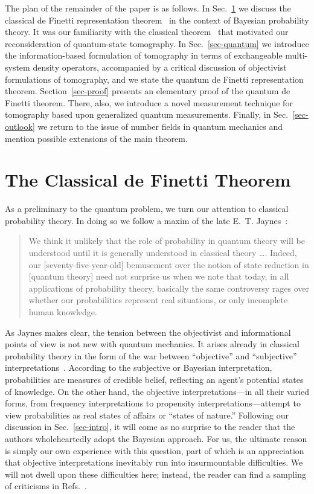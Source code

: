 The plan of the remainder of the paper is as follows. In
Sec.~\ref{sec-classical} we discuss the classical de Finetti
representation theorem~\cite{DeFinetti1990,Heath1976} in the
context of Bayesian probability theory.  It was our familiarity
with the classical theorem~\cite{Galavotti1989,Jeffrey1997} that
motivated our reconsideration of quantum-state tomography. In
Sec.~\ref{sec-quantum} we introduce the information-based
formulation of tomography in terms of exchangeable multi-system
density operators, accompanied by a critical discussion of
objectivist formulations of tomography, and we state the quantum
de Finetti representation theorem.  Section~\ref{sec-proof}
presents an elementary proof of the quantum de Finetti theorem.
There, also, we introduce a novel measurement technique for
tomography based upon generalized quantum measurements.  Finally,
in Sec.~\ref{sec-outlook} we return to the issue of number fields
in quantum mechanics and mention possible extensions of the main
theorem.

\section{The Classical de Finetti Theorem} \label{sec-classical}

As a preliminary to the quantum problem, we turn our attention to
classical probability theory.   In doing so we follow a maxim of
the late E.~T. Jaynes~\cite{Jaynes1986b}:
\begin{quote}
We think it unlikely that the role of probability in quantum theory
will be understood until it is generally understood in classical theory
\ldots.  Indeed, our [seventy-five-year-old] bemusement over the
notion of state reduction in [quantum theory] need not surprise us
when we note that today, in all applications of probability theory,
basically the same controversy rages over whether our probabilities
represent real situations, or only incomplete human knowledge.
\end{quote}

As Jaynes makes clear, the tension between the objectivist and
informational points of view is not new with quantum mechanics.
It arises already in classical probability theory in the form of
the war between ``objective'' and ``subjective''
interpretations~\cite{Daston1994}. According to the subjective or
Bayesian interpretation, probabilities are measures of credible
belief, reflecting an agent's potential states of knowledge. On
the other hand, the objective interpretations---in all their
varied forms, from frequency interpretations to propensity
interpretations---attempt to view probabilities as real states of
affairs or ``states of nature.'' Following our discussion in
Sec.~\ref{sec-intro}, it will come as no surprise to the reader
that the authors wholeheartedly adopt the Bayesian approach. For
us, the ultimate reason is simply our own experience with this
question, part of which is an appreciation that objective
interpretations inevitably run into insurmountable difficulties.
We will not dwell upon these difficulties here; instead, the
reader can find a sampling of criticisms in
Refs.~\cite{Jaynes1983,Kyburg1980,JaynesPosthumous,Bernardo1994,%
Savage1972}.

